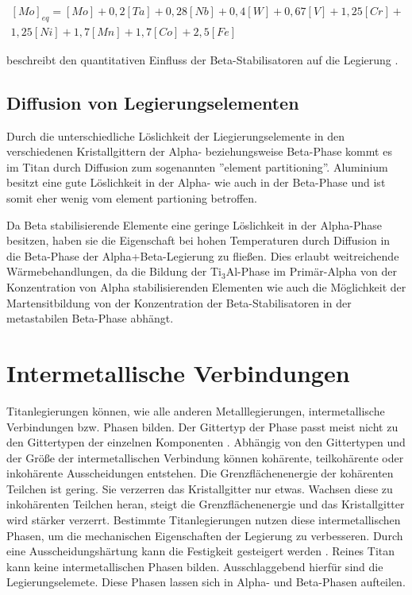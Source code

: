 \documentclass[a4paper, 11pt]{tubsreprt}
\begin{document}
\begin{equation}
\begin{split}
[Mo]_{eq}=[Mo]+0,2[Ta]+0,28[Nb]+0,4[W]+0,67[V]+1,25[Cr]+ \\
1,25[Ni]+1,7[Mn]+1,7[Co]+2,5[Fe]
\end{split}
\label{Molybdenequivalent}
\end{equation}

beschreibt den quantitativen Einfluss der Beta-Stabilisatoren auf die Legierung \cite{Luetjering2007}.
\subsection{Diffusion von Legierungselementen}\label{Kapitel Diffusion von legierungselementen}
Durch die unterschiedliche Löslichkeit der Liegierungselemente in den verschiedenen Kristallgittern der Alpha- beziehungsweise Beta-Phase kommt es im Titan durch Diffusion zum sogenannten ''element partitioning''. Aluminium besitzt eine gute Löslichkeit in der Alpha- wie auch in der Beta-Phase und ist somit eher wenig vom element partioning betroffen.

Da Beta stabilisierende Elemente eine geringe Löslichkeit in der Alpha-Phase besitzen, haben sie die Eigenschaft bei hohen Temperaturen durch Diffusion in die Beta-Phase der Alpha+Beta-Legierung zu fließen. Dies erlaubt weitreichende Wärmebehandlungen, da die Bildung der Ti$_{3}$Al-Phase im Primär-Alpha von der Konzentration von Alpha stabilisierenden Elementen wie auch die Möglichkeit der Martensitbildung von der Konzentration der Beta-Stabilisatoren in der metastabilen Beta-Phase abhängt.


\section{Intermetallische Verbindungen}
Titanlegierungen können, wie alle anderen Metalllegierungen, intermetallische Verbindungen bzw. Phasen bilden. Der Gittertyp der Phase passt meist nicht zu den Gittertypen der einzelnen Komponenten \cite[vgl.]{Domke1986}. Abhängig von den Gittertypen und der Größe der intermetallischen Verbindung können kohärente, teilkohärente oder inkohärente Ausscheidungen entstehen. Die Grenzflächenenergie der kohärenten Teilchen ist gering. Sie verzerren das Kristallgitter nur etwas. Wachsen diese zu inkohärenten Teilchen heran, steigt die Grenzflächenenergie und das Kristallgitter wird stärker verzerrt. 
Bestimmte Titanlegierungen nutzen diese intermetallischen Phasen, um die mechanischen Eigenschaften der Legierung zu verbesseren. Durch eine Ausscheidungshärtung kann die Festigkeit gesteigert werden \cite{Luetjering2007}. Reines Titan kann keine intermetallischen Phasen bilden. Ausschlaggebend hierfür sind die Legierungselemete. Diese Phasen lassen sich in Alpha- und Beta-Phasen aufteilen.  
 
\end{document}
